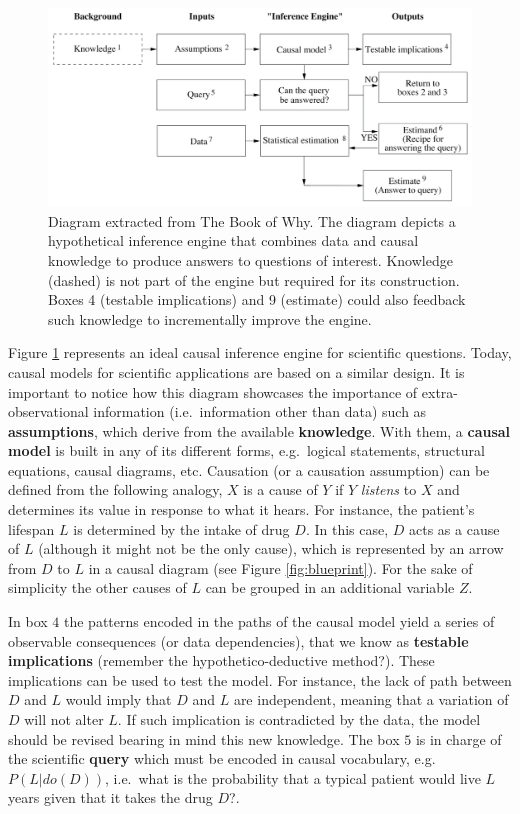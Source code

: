\documentclass[
]{book}
\begin{document}
\begin{figure}

{\centering \includegraphics[width=0.9\linewidth]{Figures/jpearl_inference_engine} 

}

\caption{Diagram extracted from The Book of Why. The diagram depicts a hypothetical inference engine that combines data and causal knowledge to produce answers to questions of interest. Knowledge (dashed) is not part of the engine but required for its construction. Boxes 4 (testable implications) and 9 (estimate) could also feedback such knowledge to incrementally improve the engine.}\label{fig:inference-engine}
\end{figure}

Figure \ref{fig:inference-engine} represents an ideal causal inference engine for scientific questions. Today, causal models for scientific applications are based on a similar design. It is important to notice how this diagram showcases the importance of extra-observational information (i.e.~information other than data) such as \textbf{assumptions}, which derive from the available \textbf{knowledge}. With them, a \textbf{causal model} is built in any of its different forms, e.g.~logical statements, structural equations, causal diagrams, etc. Causation (or a causation assumption) can be defined from the following analogy, \(X\) is a cause of \(Y\) if \(Y\) \emph{listens} to \(X\) and determines its value in response to what it hears. For instance, the patient's lifespan \(L\) is determined by the intake of drug \(D\). In this case, \(D\) acts as a cause of \(L\) (although it might not be the only cause), which is represented by an arrow from \(D\) to \(L\) in a causal diagram (see Figure \ref{fig:blueprint}). For the sake of simplicity the other causes of \(L\) can be grouped in an additional variable \(Z\).

In box \(4\) the patterns encoded in the paths of the causal model yield a series of observable consequences (or data dependencies), that we know as \textbf{testable implications} (remember the hypothetico-deductive method?). These implications can be used to test the model. For instance, the lack of path between \(D\) and \(L\) would imply that \(D\) and \(L\) are independent, meaning that a variation of \(D\) will not alter \(L\). If such implication is contradicted by the data, the model should be revised bearing in mind this new knowledge. The box \(5\) is in charge of the scientific \textbf{query} which must be encoded in causal vocabulary, e.g.~\(P(L | do(D))\), i.e.~what is the probability that a typical patient would live \(L\) years given that it takes the drug \(D\)?.
\end{document}
